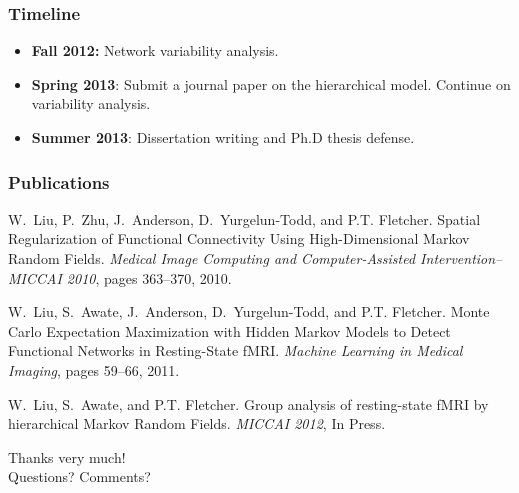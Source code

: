 \documentclass[serif]{beamer}
\begin{document}
\begin{frame}
\frametitle{Timeline}
\begin{block}{}
  \begin{itemize}
  \item \textbf{Fall 2012:} Network variability analysis.
  \item \textbf{Spring 2013}: Submit a journal paper on the hierarchical
    model. Continue on variability analysis.
  \item \textbf{Summer 2013}: Dissertation writing and Ph.D thesis defense.
  \end{itemize}
\end{block}
\end{frame}

\begin{frame}
  \frametitle{Publications}

  \renewcommand{\refname}{List of Publications}
  {\footnotesize
    \begin{thebibliography}{1}

W.~Liu, P.~Zhu, J.~Anderson, D.~Yurgelun-Todd, and P.T. Fletcher.
\newblock Spatial {R}egularization of {F}unctional {C}onnectivity {U}sing
  {H}igh-{D}imensional {M}arkov {R}andom {F}ields.
\newblock \emph{Medical Image Computing and Computer-Assisted
  Intervention--MICCAI 2010}, pages 363--370, 2010.

W.~Liu, S.~Awate, J.~Anderson, D.~Yurgelun-Todd, and P.T. Fletcher.
\newblock Monte {C}arlo {E}xpectation {M}aximization with {H}idden {M}arkov
  {M}odels to {D}etect {F}unctional {N}etworks in {R}esting-{S}tate {fMRI}.
\newblock \emph{Machine Learning in Medical Imaging}, pages 59--66, 2011.

W.~Liu, S.~Awate, and P.T. Fletcher.
\newblock Group analysis of resting-state {fMRI} by hierarchical {M}arkov
  {R}andom {F}ields.
\newblock \emph{MICCAI 2012}, In Press.

\end{thebibliography}
    }
\end{frame}

\begin{frame}
  \begin{block}{}
    Thanks very much! \\
    Questions? Comments?
  \end{block}
\end{frame}
\end{document}
